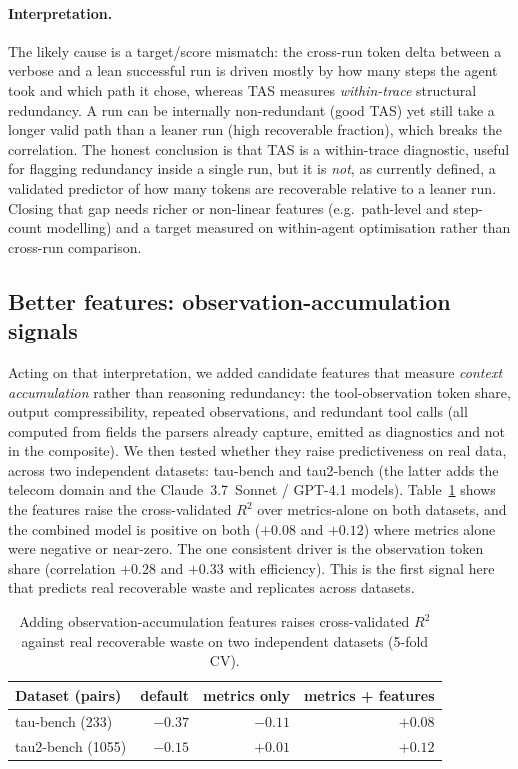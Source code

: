 \documentclass[11pt]{article}
\begin{document}
\paragraph{Interpretation.} The likely cause is a target/score mismatch: the
cross-run token delta between a verbose and a lean successful run is driven
mostly by how many steps the agent took and which path it chose, whereas TAS
measures \emph{within-trace} structural redundancy. A run can be internally
non-redundant (good TAS) yet still take a longer valid path than a leaner run
(high recoverable fraction), which breaks the correlation. The honest conclusion
is that TAS is a within-trace diagnostic, useful for flagging redundancy inside a
single run, but it is \emph{not}, as currently defined, a validated predictor of
how many tokens are recoverable relative to a leaner run. Closing that gap needs
richer or non-linear features (e.g.\ path-level and step-count modelling) and a
target measured on within-agent optimisation rather than cross-run comparison.

\subsection{Better features: observation-accumulation signals}
\label{sec:betterfeatures}
Acting on that interpretation, we added candidate features that measure
\emph{context accumulation} rather than reasoning redundancy: the tool-observation
token share, output compressibility, repeated observations, and redundant tool
calls (all computed from fields the parsers already capture, emitted as
diagnostics and not in the composite). We then tested whether they raise
predictiveness on real data, across two independent datasets:
tau-bench and tau2-bench (the latter adds the telecom domain and the
Claude~3.7~Sonnet / GPT-4.1 models). Table~\ref{tab:features} shows the features
raise the cross-validated $R^2$ over metrics-alone on both datasets, and the
combined model is positive on both ($+0.08$ and $+0.12$) where metrics alone were
negative or near-zero. The one consistent driver is the observation token share
(correlation $+0.28$ and $+0.33$ with efficiency). This is the first signal here
that predicts real recoverable waste and replicates across datasets.

\begin{table}[t]
\centering
\caption{Adding observation-accumulation features raises cross-validated $R^2$
against real recoverable waste on two independent datasets (5-fold CV).}
\label{tab:features}
\begin{tabular}{lrrr}
\toprule
Dataset (pairs) & default & metrics only & metrics + features \\
\midrule
tau-bench (233)    & $-0.37$ & $-0.11$ & $\mathbf{+0.08}$ \\
tau2-bench (1055)  & $-0.15$ & $+0.01$ & $\mathbf{+0.12}$ \\
\bottomrule
\end{tabular}
\end{table}
\end{document}
